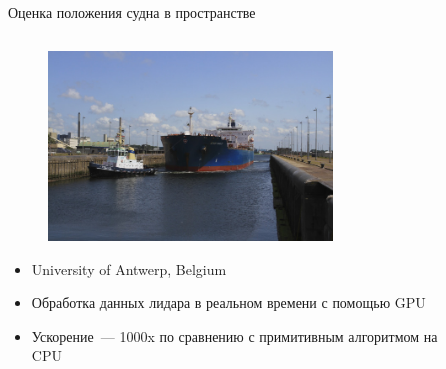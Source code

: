 \documentclass[@BEAMER_OPTIONS@]{beamer}
\begin{document}
\begin{frame}{Оценка положения судна в пространстве}
    \begin{columns}
        \begin{column}{0.5\textwidth}
            \vspace{-2\baselineskip}
            \begin{figure}
                \includegraphics[width=0.8\textwidth]{ship-channel}
            \end{figure}
            \begin{itemize}
                \item University of Antwerp, Belgium
                \item Обработка данных лидара в реальном времени с помощью GPU
                \item Ускорение~--- 1000x по сравнению с примитивным алгоритмом
                    на CPU
            \end{itemize}
        \end{column}
        \begin{column}{0.45\textwidth}
            \vspace{-3\baselineskip}
            \begin{figure}

\end{figure}
\end{column}
\end{columns}
\end{frame}
\end{document}
